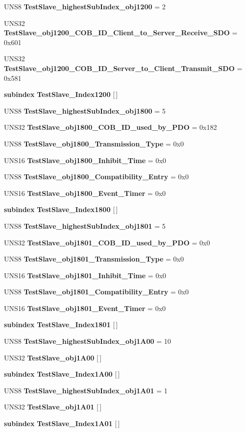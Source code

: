 \begin{CompactItemize}
\item 
UNS8 {\bf Test\-Slave\_\-highest\-Sub\-Index\_\-obj1200} = 2
\item 
UNS32 {\bf Test\-Slave\_\-obj1200\_\-COB\_\-ID\_\-Client\_\-to\_\-Server\_\-Receive\_\-SDO} = 0x601
\item 
UNS32 {\bf Test\-Slave\_\-obj1200\_\-COB\_\-ID\_\-Server\_\-to\_\-Client\_\-Transmit\_\-SDO} = 0x581
\item 
{\bf subindex} {\bf Test\-Slave\_\-Index1200} [$\,$]
\item 
UNS8 {\bf Test\-Slave\_\-highest\-Sub\-Index\_\-obj1800} = 5
\item 
UNS32 {\bf Test\-Slave\_\-obj1800\_\-COB\_\-ID\_\-used\_\-by\_\-PDO} = 0x182
\item 
UNS8 {\bf Test\-Slave\_\-obj1800\_\-Transmission\_\-Type} = 0x0
\item 
UNS16 {\bf Test\-Slave\_\-obj1800\_\-Inhibit\_\-Time} = 0x0
\item 
UNS8 {\bf Test\-Slave\_\-obj1800\_\-Compatibility\_\-Entry} = 0x0
\item 
UNS16 {\bf Test\-Slave\_\-obj1800\_\-Event\_\-Timer} = 0x0
\item 
{\bf subindex} {\bf Test\-Slave\_\-Index1800} [$\,$]
\item 
UNS8 {\bf Test\-Slave\_\-highest\-Sub\-Index\_\-obj1801} = 5
\item 
UNS32 {\bf Test\-Slave\_\-obj1801\_\-COB\_\-ID\_\-used\_\-by\_\-PDO} = 0x0
\item 
UNS8 {\bf Test\-Slave\_\-obj1801\_\-Transmission\_\-Type} = 0x0
\item 
UNS16 {\bf Test\-Slave\_\-obj1801\_\-Inhibit\_\-Time} = 0x0
\item 
UNS8 {\bf Test\-Slave\_\-obj1801\_\-Compatibility\_\-Entry} = 0x0
\item 
UNS16 {\bf Test\-Slave\_\-obj1801\_\-Event\_\-Timer} = 0x0
\item 
{\bf subindex} {\bf Test\-Slave\_\-Index1801} [$\,$]
\item 
UNS8 {\bf Test\-Slave\_\-highest\-Sub\-Index\_\-obj1A00} = 10
\item 
UNS32 {\bf Test\-Slave\_\-obj1A00} [$\,$]
\item 
{\bf subindex} {\bf Test\-Slave\_\-Index1A00} [$\,$]
\item 
UNS8 {\bf Test\-Slave\_\-highest\-Sub\-Index\_\-obj1A01} = 1
\item 
UNS32 {\bf Test\-Slave\_\-obj1A01} [$\,$]
\item 
{\bf subindex} {\bf Test\-Slave\_\-Index1A01} [$\,$]

\end{CompactItemize}
